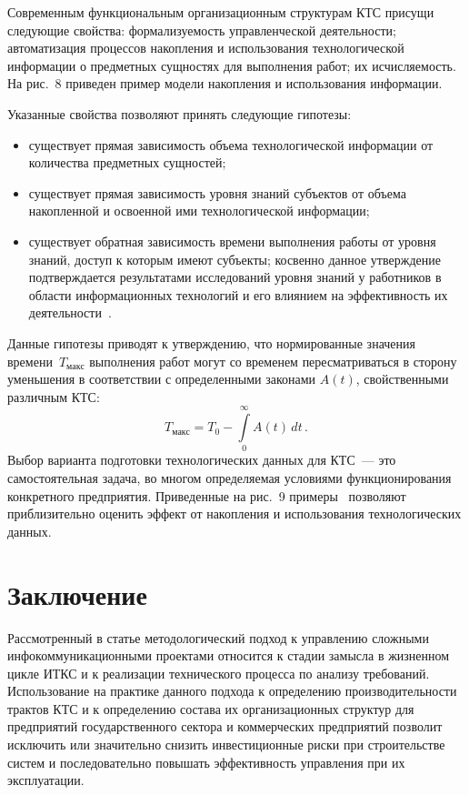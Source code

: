 \begin{multicols}{2}
     
     Современным функциональным организационным структурам КТС присущи 
следующие свойства: формализуемость управленческой де\-я\-тель\-ности; автоматизация 
процессов накопления и\linebreak
 использования технологической информации о предметных 
сущностях для выполнения работ; их исчисляемость. На рис.~8 приведен пример модели 
накопления и использования информации.


Указанные свойства позволяют принять следующие гипотезы:
\begin{itemize}
\item существует прямая зависимость объема технологической информации от количества 
предметных сущностей;
\item существует прямая зависимость уровня знаний субъектов от объема накопленной и 
освоенной ими технологической информации;
\item существует обратная зависимость времени выполнения работы от уровня знаний, 
доступ к которым имеют субъекты; косвенно данное утверждение подтверждается 
результатами исследований уровня знаний у работников в об\-ласти информационных 
технологий и его влиянием на эффективность их деятельности~\cite{7-z}.
\end{itemize}

Данные гипотезы приводят к утверждению, что нормированные значения 
времени~$T_{\mathrm{макс}}$ выполнения работ могут со временем пересматриваться в 
сторону уменьшения в соответствии с определенными законами $A(t)$, свойственными 
различным КТС:
\begin{equation*}
T_{\mathrm{макс}}=T_0-\int\limits_0^\infty A(t)\,dt\,.
\label{e15-z}
\end{equation*}
Выбор варианта подготовки технологических данных для КТС~--- это самостоятельная 
задача, во многом определяемая условиями функционирования конкретного предприятия. 
Приведенные на рис.~9 примеры~\cite{8-z} позволяют приблизительно оценить эффект от 
накопления и использования технологических данных. 

\vspace*{-6pt}

\section{Заключение}

     Рассмотренный в статье методологический подход к управлению сложными 
инфокоммуникационными проектами относится к стадии замысла в жизненном цикле 
ИТКС и к реализации технического процесса по анализу требований. Использование на 
практике данного подхода к определению производительности трактов КТС и к 
определению состава их организационных структур для предприятий государственного 
сектора и коммерческих предприятий позволит исключить или значительно снизить 
инвестиционные риски при строительстве сис\-тем и последовательно повышать 
эффективность управления при их эксплуатации. 


\end{multicols}
